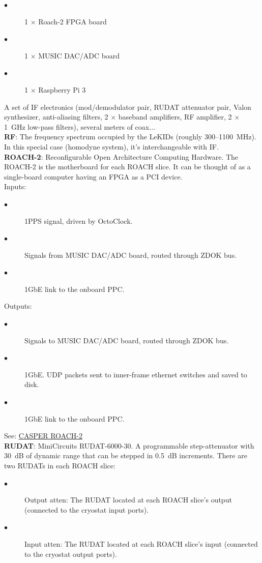 \begin{description}
  \item[$\bullet$] 1 $\times$ Roach-2 FPGA board
  \item[$\bullet$] 1 $\times$ MUSIC DAC/ADC board
  \item[$\bullet$] 1 $\times$ Raspberry Pi 3
\end{description}
A set of IF electronics (mod/demodulator pair, RUDAT attenuator pair, Valon synthesizer, anti-aliasing filters, 2 $\times$ baseband amplifiers, RF amplifier, 2 $\times$ 1~GHz low-pass filters), several meters of coax$\ldots$ \\
\textbf{RF}: The frequency spectrum occupied by the LeKIDs (roughly 300--1100~MHz). In this special case (homodyne system), it’s interchangeable with IF.\\
\textbf{ROACH-2}: Reconfigurable Open Architecture Computing Hardware. The ROACH-2 is the motherboard for each ROACH slice. It can be thought of as a single-board computer having an FPGA as a PCI device.\\
Inputs:
\begin{description}
  \item[$\bullet$] 1PPS signal, driven by OctoClock.
  \item[$\bullet$] Signals from MUSIC DAC/ADC board, routed through ZDOK bus.
  \item[$\bullet$] 1GbE link to the onboard PPC\@.
\end{description}
Outputs:
\begin{description}
  \item[$\bullet$] Signals to MUSIC DAC/ADC board, routed through ZDOK bus.
  \item[$\bullet$] 1GbE. UDP packets sent to inner-frame ethernet switches and saved to disk.
  \item[$\bullet$] 1GbE link to the onboard PPC\@.
\end{description}
See: \href{https://casper.ssl.berkeley.edu/wiki/ROACH-2_Revision_2}{CASPER ROACH-2}\\
\textbf{RUDAT}: MiniCircuits RUDAT-6000-30. A programmable step-attenuator with 30~dB of dynamic range that can be stepped in 0.5~dB increments. There are two RUDATs in each ROACH slice:
\begin{description}
  \item[$\bullet$] Output atten: The RUDAT located at each ROACH slice’s output (connected to the cryostat input ports).
  \item[$\bullet$] Input atten: The RUDAT located at each ROACH slice’s input (connected to the cryostat output ports).
\end{description}
